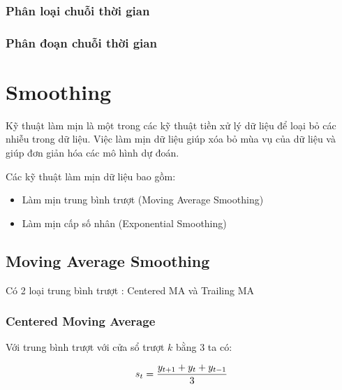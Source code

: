\documentclass[
]{book}
\providecommand{\tightlist}{%
  \setlength{\itemsep}{0pt}\setlength{\parskip}{0pt}}
\begin{document}
\hypertarget{phuxe2n-loux1ea1i-chuux1ed7i-thux1eddi-gian}{%
\subsection{Phân loại chuỗi thời gian}\label{phuxe2n-loux1ea1i-chuux1ed7i-thux1eddi-gian}}

\hypertarget{phuxe2n-ux111oux1ea1n-chuux1ed7i-thux1eddi-gian}{%
\subsection{Phân đoạn chuỗi thời gian}\label{phuxe2n-ux111oux1ea1n-chuux1ed7i-thux1eddi-gian}}

\hypertarget{smoothing}{%
\chapter{Smoothing}\label{smoothing}}

Kỹ thuật làm mịn là một trong các kỹ thuật tiền xử lý dữ liệu để loại bỏ các nhiễu trong dữ liệu. Việc làm mịn dữ liệu giúp xóa bỏ mùa vụ của dữ liệu và giúp đơn giản hóa các mô hình dự đoán.

Các kỹ thuật làm mịn dữ liệu bao gồm:

\begin{itemize}
\tightlist
\item
  Làm mịn trung bình trượt (Moving Average Smoothing)
\item
  Làm mịn cấp số nhân (Exponential Smoothing)
\end{itemize}

\hypertarget{moving-average-smoothing}{%
\section{Moving Average Smoothing}\label{moving-average-smoothing}}

Có 2 loại trung bình trượt : Centered MA và Trailing MA

\hypertarget{centered-moving-average}{%
\subsection{Centered Moving Average}\label{centered-moving-average}}

Với trung bình trượt với cửa sổ trượt \(k\) bằng 3 ta có:

\[\begin{align}
\Large s_{t} = \frac{y_{t+1} + y_{t} + y_{t-1}}{3}
\end{align}\]
\end{document}
